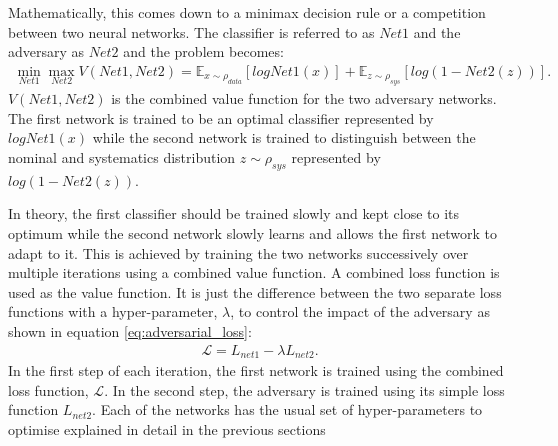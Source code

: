 Mathematically, this comes down to a minimax decision rule or a competition between two neural networks. The classifier is referred to as $Net1$ and the adversary as $Net2$ and the problem becomes:
%
\begin{align}
    \min_{Net1} \max_{Net2} V(Net1, Net2) = \mathbb{E}_{\mathit{x} \sim \rho_{data}} [ log Net1(\mathit{x}) ] + \mathbb{E}_{\mathit{z} \sim \rho_{sys}} [ log (1 - Net2(\mathit{z}) ) ].
\end{align}
%
$V(Net1, Net2)$ is the combined value function for the two adversary networks. The first network is trained to be an optimal classifier represented by $log Net1(\mathit{x})$ while the second network is trained to distinguish between the nominal and systematics distribution $\mathit{z} \sim \rho_{sys}$ represented by $log (1 - Net2(\mathit{z}))$.

 In theory, the first classifier should be trained slowly and kept close to its optimum while the second network slowly learns and allows the first network to adapt to it. This is achieved by training the two networks successively over multiple iterations using a combined value function.
A combined loss function is used as the value function. It is just the difference between the two separate loss functions with a hyper-parameter, $\lambda$, to control the impact of the adversary as shown in equation \eqref{eq:adversarial_loss}:
%
\begin{align}
    \mathcal{L} = L_{net1} - \lambda L_{net2}.
    \label{eq:adversarial_loss}
\end{align}
%
In the first step of each iteration, the first network is trained using the combined loss function, $\mathcal{L}$. In the second step, the adversary is trained using its simple loss function $L_{net2}$. Each of the networks has the usual set of hyper-parameters to optimise explained in detail in the previous sections


